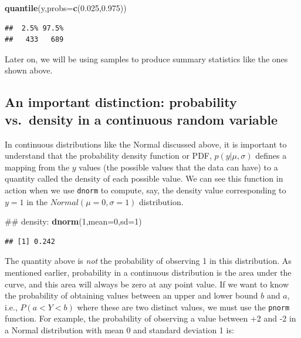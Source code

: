 \documentclass[12pt,]{krantz}
\newenvironment{Shaded}{\begin{snugshade}}{\end{snugshade}}
\newcommand{\KeywordTok}[1]{\textcolor[rgb]{0.13,0.29,0.53}{\textbf{#1}}}
\newcommand{\DataTypeTok}[1]{\textcolor[rgb]{0.13,0.29,0.53}{#1}}
\newcommand{\DecValTok}[1]{\textcolor[rgb]{0.00,0.00,0.81}{#1}}
\newcommand{\FloatTok}[1]{\textcolor[rgb]{0.00,0.00,0.81}{#1}}
\newcommand{\NormalTok}[1]{#1}
\theoremstyle{definition}
\theoremstyle{definition}
\theoremstyle{definition}
\theoremstyle{remark}
\begin{document}
\begin{Shaded}
\begin{Highlighting}[]
\KeywordTok{quantile}\NormalTok{(y,}\DataTypeTok{probs=}\KeywordTok{c}\NormalTok{(}\FloatTok{0.025}\NormalTok{,}\FloatTok{0.975}\NormalTok{))}
\end{Highlighting}
\end{Shaded}

\begin{verbatim}
##  2.5% 97.5% 
##   433   689
\end{verbatim}

Later on, we will be using samples to produce summary statistics like
the ones shown above.

\subsection{An important distinction: probability vs.~density in a
continuous random
variable}\label{an-important-distinction-probability-vs.density-in-a-continuous-random-variable}

In continuous distributions like the Normal discussed above, it is
important to understand that the probability density function or PDF,
\(p(y| \mu, \sigma)\) defines a mapping from the \(y\) values (the
possible values that the data can have) to a quantity called the density
of each possible value. We can see this function in action when we use
\texttt{dnorm} to compute, say, the density value corresponding to
\(y=1\) in the \(Normal(\mu=0,\sigma=1)\) distribution.

\begin{Shaded}
\begin{Highlighting}[]
\NormalTok{## density:}
\KeywordTok{dnorm}\NormalTok{(}\DecValTok{1}\NormalTok{,}\DataTypeTok{mean=}\DecValTok{0}\NormalTok{,}\DataTypeTok{sd=}\DecValTok{1}\NormalTok{)}
\end{Highlighting}
\end{Shaded}

\begin{verbatim}
## [1] 0.242
\end{verbatim}

The quantity above is \emph{not} the probability of observing 1 in this
distribution. As mentioned earlier, probability in a continuous
distribution is the area under the curve, and this area will always be
zero at any point value. If we want to know the probability of obtaining
values between an upper and lower bound \(b\) and \(a\), i.e.,
\(P(a<Y<b)\) where these are two distinct values, we must use the
\texttt{pnorm} function. For example, the probability of observing a
value between +2 and -2 in a Normal distribution with mean 0 and
standard deviation 1 is:
\end{document}
